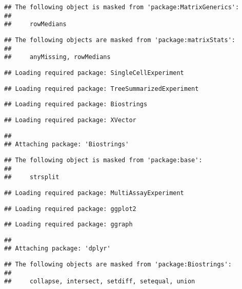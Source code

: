 \documentclass[
  oneside]{book}
\begin{document}
\begin{verbatim}
## The following object is masked from 'package:MatrixGenerics':
## 
##     rowMedians
\end{verbatim}

\begin{verbatim}
## The following objects are masked from 'package:matrixStats':
## 
##     anyMissing, rowMedians
\end{verbatim}

\begin{verbatim}
## Loading required package: SingleCellExperiment
\end{verbatim}

\begin{verbatim}
## Loading required package: TreeSummarizedExperiment
\end{verbatim}

\begin{verbatim}
## Loading required package: Biostrings
\end{verbatim}

\begin{verbatim}
## Loading required package: XVector
\end{verbatim}

\begin{verbatim}
## 
## Attaching package: 'Biostrings'
\end{verbatim}

\begin{verbatim}
## The following object is masked from 'package:base':
## 
##     strsplit
\end{verbatim}

\begin{verbatim}
## Loading required package: MultiAssayExperiment
\end{verbatim}

\begin{verbatim}
## Loading required package: ggplot2
\end{verbatim}

\begin{verbatim}
## Loading required package: ggraph
\end{verbatim}

\begin{verbatim}
## 
## Attaching package: 'dplyr'
\end{verbatim}

\begin{verbatim}
## The following objects are masked from 'package:Biostrings':
## 
##     collapse, intersect, setdiff, setequal, union
\end{verbatim}
\end{document}
